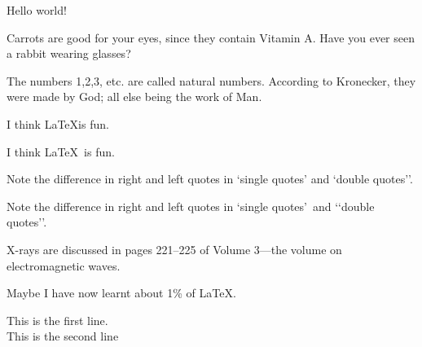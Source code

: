 \documentclass{article}
\begin{document}
Hello world!

Carrots are good for your eyes, since they contain Vitamin A\@. Have
you ever seen a rabbit wearing glasses?

The numbers 1,2,3, etc. are called natural numbers. According to Kronecker, they were made by God; all else being the work of Man.

I think \LaTeX is fun.


I think \LaTeX\ is fun.

Note the difference in right and left quotes in ‘single quotes’
and ‘double quotes’’.


Note the difference in right and left quotes in \lq single
quotes\rq\ and \lq\lq double quotes\rq\rq.



X-rays are discussed in pages 221--225 of Volume 3---the volume on
electromagnetic waves.

Maybe I have now learnt about 1\% of \LaTeX.


This is the first line.\\  %
This is the second line
\end{document}
